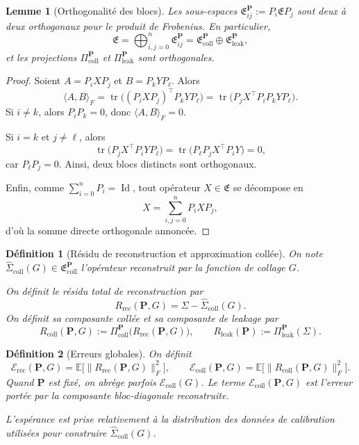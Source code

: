 \documentclass[11pt,a4paper]{article}
\newtheorem{definition}{Définition}[section]
\newtheorem{lemma}{Lemme}[section]
\DeclareMathOperator{\Id}{Id}
\DeclareMathOperator{\tr}{tr}
\newcommand{\1}{\mathbf 1}
\begin{document}
\begin{lemma}[Orthogonalité des blocs]
Les sous-espaces \(\mathfrak E_{ij}^{\mathbf P}:=P_i\mathfrak E P_j\) sont deux à deux orthogonaux pour le produit de Frobenius.
En particulier,
\[
\mathfrak E
=
\bigoplus_{i,j=0}^n \mathfrak E_{ij}^{\mathbf P}
=
\mathfrak E_{\mathrm{coll}}^{\mathbf P}\oplus \mathfrak E_{\mathrm{leak}}^{\mathbf P},
\]
et les projections \(\Pi_{\mathrm{coll}}^{\mathbf P}\) et \(\Pi_{\mathrm{leak}}^{\mathbf P}\) sont orthogonales.
\end{lemma}

\begin{proof}
Soient \(A=P_iXP_j\) et \(B=P_kYP_\ell\). Alors
\[
\langle A,B\rangle_F
=
\tr\!\bigl((P_iXP_j)^\top P_kYP_\ell\bigr)
=
\tr\!\bigl(P_jX^\top P_iP_kYP_\ell\bigr).
\]
Si \(i\neq k\), alors \(P_iP_k=0\), donc \(\langle A,B\rangle_F=0\).

Si \(i=k\) et \(j\neq \ell\), alors
\[
\tr\!\bigl(P_jX^\top P_iYP_\ell\bigr)
=
\tr\!\bigl(P_\ell P_jX^\top P_iY\bigr)=0,
\]
car \(P_\ell P_j=0\). Ainsi, deux blocs distincts sont orthogonaux.

Enfin, comme \(\sum_{i=0}^n P_i=\Id\), tout opérateur \(X\in\mathfrak E\) se décompose en
\[
X=\sum_{i,j=0}^n P_iXP_j,
\]
d'où la somme directe orthogonale annoncée.
\end{proof}

\begin{definition}[Résidu de reconstruction et approximation collée]
On note \(\widehat \Sigma_{\mathrm{coll}}(G)\in\mathfrak E_{\mathrm{coll}}^{\mathbf P}\) l'opérateur reconstruit par la fonction de collage \(G\).

On définit le résidu total de reconstruction par
\[
R_{\mathrm{rec}}(\mathbf P,G)
=
\Sigma-\widehat \Sigma_{\mathrm{coll}}(G).
\]
On définit sa composante collée et sa composante de leakage par
\[
R_{\mathrm{coll}}(\mathbf P,G)
:=
\Pi_{\mathrm{coll}}^{\mathbf P}\!\bigl(R_{\mathrm{rec}}(\mathbf P,G)\bigr),
\qquad
R_{\mathrm{leak}}(\mathbf P)
:=
\Pi_{\mathrm{leak}}^{\mathbf P}(\Sigma).
\]
\end{definition}

\begin{definition}[Erreurs globales]
On définit
\[
\mathcal E_{\mathrm{rec}}(\mathbf P,G)
=
\mathbb E\bigl[\|R_{\mathrm{rec}}(\mathbf P,G)\|_F^2\bigr],
\qquad
\mathcal E_{\mathrm{coll}}(\mathbf P,G)
=
\mathbb E\bigl[\|R_{\mathrm{coll}}(\mathbf P,G)\|_F^2\bigr].
\]
Quand \(\mathbf P\) est fixé, on abrège parfois \(\mathcal E_{\mathrm{coll}}(G)\).
Le terme \(\mathcal E_{\mathrm{coll}}(\mathbf P,G)\) est l'erreur portée par la composante bloc-diagonale reconstruite.

L'espérance est prise relativement à la distribution des données de calibration utilisées pour construire
\(\widehat \Sigma_{\mathrm{coll}}(G)\).
\end{definition}
\end{document}
